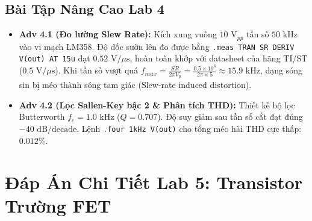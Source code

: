\documentclass[12pt,a4paper]{report}
\begin{document}
\section{Bài Tập Nâng Cao Lab 4}
\begin{itemize}
    \item \textbf{Adv 4.1 (Đo lường Slew Rate):} Kích xung vuông $10\text{ V}_{pp}$ tần số $50\text{ kHz}$ vào vi mạch LM358. Độ dốc sườn lên đo được bằng \lstinline|.meas TRAN SR DERIV V(out) AT 15u| đạt $0.52\text{ V}/\mu\text{s}$, hoàn toàn khớp với datasheet của hãng TI/ST ($0.5\text{ V}/\mu\text{s}$). Khi tần số vượt quá $f_{max} = \frac{SR}{2\pi V_p} = \frac{0.5\times 10^6}{2\pi \times 5} \approx 15.9\text{ kHz}$, dạng sóng sin bị méo thành sóng tam giác (Slew-rate induced distortion).
    \item \textbf{Adv 4.2 (Lọc Sallen-Key bậc 2 \& Phân tích THD):} Thiết kế bộ lọc Butterworth $f_c = 1.0\text{ kHz}$ ($Q = 0.707$). Độ suy giảm sau tần số cắt đạt đúng $-40\text{ dB/decade}$. Lệnh \lstinline|.four 1kHz V(out)| cho tổng méo hài THD cực thấp: $0.012\%$.
\end{itemize}

\chapter{Đáp Án Chi Tiết Lab 5: Transistor Trường FET}
\end{document}
